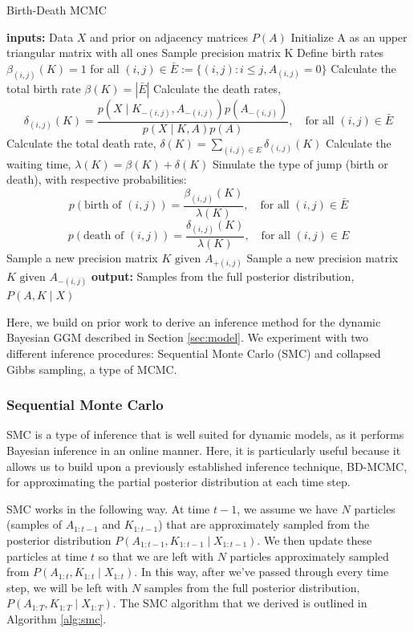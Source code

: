 \documentclass{article}
\begin{document}
\begin{algorithm}[h!tbp]
\caption{Birth-Death MCMC}
\begin{algorithmic}[1]
\STATE \textbf{inputs:} Data $X$ and prior on adjacency matrices $P(A)$
\STATE Initialize A as an upper triangular matrix with all ones
\STATE Sample precision matrix K
\STATE Define birth rates $\beta_{(i,j)}(K) = 1$ for all $(i,j) \in \bar{E} := \{(i,j): i \leq j, A_{(i,j)} = 0\}$
\REPEAT 
\STATE Calculate the total birth rate $\beta(K) = |\bar{E}|$ 
\STATE Calculate the death rates, $$\delta_{(i,j)}(K) = \frac{p(X \mid K_{-(i,j)},A_{-(i,j)})p(A_{-(i,j)})}{p(X \mid K,A)p(A)}, \quad \text{for all }(i,j) \in \bar{E}$$
\STATE Calculate the total death rate, $\delta(K) = \sum_{(i,j) \in E} \delta_{(i,j)}(K)$
\STATE Calculate the waiting time, $\lambda(K) = \beta(K)+\delta(K)$
\STATE Simulate the type of jump (birth or death), with respective probabilities: $$ p(\text{birth of } (i,j)) = \frac{\beta_{(i,j)}(K)}{\lambda(K)}, \quad \text{for all } (i,j) \in \bar{E}$$ $$ p(\text{death of } (i,j)) = \frac{\delta_{(i,j)}(K)}{\lambda(K)}, \quad \text{for all } (i,j) \in E$$
 Sample a new precision matrix $K \text{ given } A_{+(i,j)}$ 
 Sample a new precision matrix $K \text{ given } A_{-(i,j)}$
\ENDIF
{}
\STATE \textbf{output:} Samples from the full posterior distribution, $P(A,K \mid X)$
\end{algorithmic}
\label{alg:bdmcmc}
\end{algorithm}

Here, we build on prior work to derive an inference method for the dynamic Bayesian GGM described in Section \ref{sec:model}. We experiment with two different inference procedures: Sequential Monte Carlo (SMC) and collapsed Gibbs sampling, a type of MCMC. 

\subsubsection{Sequential Monte Carlo}

SMC is a type of inference that is well suited for dynamic models, as it performs Bayesian inference in an online manner. Here, it is particularly useful because it allows us to build upon a previously established inference technique, BD-MCMC, for approximating the partial posterior distribution at each time step.

SMC works in the following way. At time $t-1$, we assume we have $N$ particles (samples of $A_{1:t-1}$ and $K_{1:t-1}$) that are approximately sampled from the posterior distribution $P(A_{1:t-1},K_{1:t-1} \mid X_{1:t-1})$. We then update these particles at time $t$ so that we are left with $N$ particles approximately sampled from $P(A_{1:t},K_{1:t} \mid X_{1:t})$. In this way, after we've passed through every time step, we will be left with $N$ samples from the full posterior distribution, $P(A_{1:T},K_{1:T} \mid X_{1:T})$. The SMC algorithm that we derived is outlined in Algorithm \ref{alg:smc}. 
\end{document}
